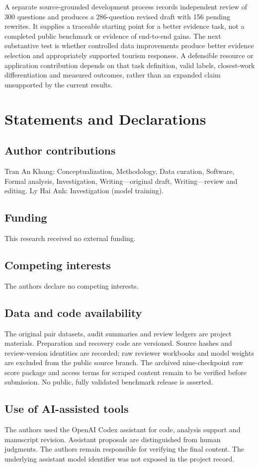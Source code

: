 \documentclass[preprint,12pt,numbers,sort&compress]{elsarticle}
\begin{document}
A separate source-grounded development process records independent review of
300 questions and produces a 286-question revised draft with 156 pending
rewrites. It supplies a traceable starting point for a better evidence task,
not a completed public benchmark or evidence of end-to-end gains. The next
substantive test is whether controlled data improvements produce better evidence
selection and appropriately supported tourism responses. A defensible resource
or application contribution depends on that task definition, valid labels,
closest-work differentiation and measured outcomes, rather than an expanded
claim unsupported by the current results.

\section*{Statements and Declarations}
\subsection*{Author contributions}
Tran An Khang: Conceptualization, Methodology, Data curation, Software,
Formal analysis, Investigation, Writing---original draft, Writing---review
and editing. Ly Hai Anh: Investigation (model training).
\subsection*{Funding}
This research received no external funding.
\subsection*{Competing interests}
The authors declare no competing interests.
\subsection*{Data and code availability}
The original pair datasets, audit summaries and review ledgers are project
materials. Preparation and recovery code are versioned. Source hashes and
review-version identities are recorded; raw reviewer workbooks and model
weights are excluded from the public source branch. The archived nine-checkpoint
raw score package and access terms for scraped content remain to be verified
before submission. No public, fully validated benchmark release is asserted.
\subsection*{Use of AI-assisted tools}
The authors used the OpenAI Codex assistant for code, analysis support and
manuscript revision. Assistant proposals are distinguished from human judgments.
The authors remain responsible for verifying the final content. The underlying
assistant model identifier was not exposed in the project record.



\end{document}
